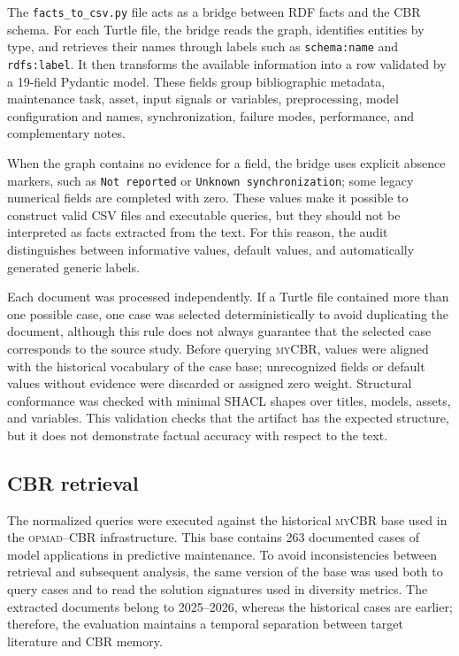 \documentclass[journal]{IEEEtran}
\newcommand{\OPMAD}{\textsc{opmad}}
\newcommand{\myCBR}{\textsc{myCBR}}
\begin{document}
The \texttt{facts\_to\_csv.py} file acts as a bridge between RDF facts and the CBR schema. For each Turtle file, the bridge reads the graph, identifies entities by type, and retrieves their names through labels such as \texttt{schema:name} and \texttt{rdfs:label}. It then transforms the available information into a row validated by a 19-field Pydantic model. These fields group bibliographic metadata, maintenance task, asset, input signals or variables, preprocessing, model configuration and names, synchronization, failure modes, performance, and complementary notes.

When the graph contains no evidence for a field, the bridge uses explicit absence markers, such as \texttt{Not reported} or \texttt{Unknown synchronization}; some legacy numerical fields are completed with zero. These values make it possible to construct valid CSV files and executable queries, but they should not be interpreted as facts extracted from the text. For this reason, the audit distinguishes between informative values, default values, and automatically generated generic labels.

Each document was processed independently. If a Turtle file contained more than one possible case, one case was selected deterministically to avoid duplicating the document, although this rule does not always guarantee that the selected case corresponds to the source study. Before querying \myCBR{}, values were aligned with the historical vocabulary of the case base; unrecognized fields or default values without evidence were discarded or assigned zero weight. Structural conformance was checked with minimal SHACL shapes over titles, models, assets, and variables. This validation checks that the artifact has the expected structure, but it does not demonstrate factual accuracy with respect to the text.

\subsection{CBR retrieval}

The normalized queries were executed against the historical \myCBR{} base used in the \OPMAD{}--CBR infrastructure. This base contains 263 documented cases of model applications in predictive maintenance. To avoid inconsistencies between retrieval and subsequent analysis, the same version of the base was used both to query cases and to read the solution signatures used in diversity metrics. The extracted documents belong to 2025--2026, whereas the historical cases are earlier; therefore, the evaluation maintains a temporal separation between target literature and CBR memory.
\end{document}
